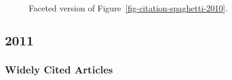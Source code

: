 \documentclass[
  10pt,
  letterpaper,
  DIV=11,
  numbers=noendperiod,
  twoside]{scrartcl}
\begin{document}
\begin{figure}


\caption{\label{fig-citation-facet-2010}Faceted version of
Figure~\ref{fig-citation-spaghetti-2010}.}

\end{figure}%

\newpage

\subsection{2011}\label{sec-s2011}

\subsubsection*{Widely Cited Articles}\label{widely-cited-articles-55}
\end{document}
